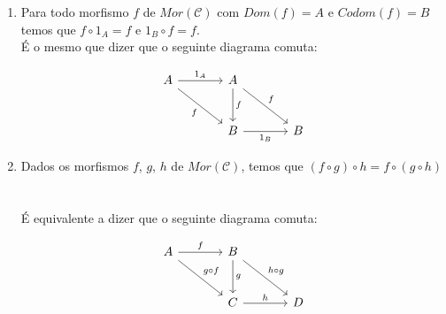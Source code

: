 \begin{defi}[Categorias]
\begin{enumerate}
\item Para todo morfismo $f$ de $Mor(\mathcal{C})$ com $Dom(f) = A$ e $Codom(f) = B$ temos que $f \circ 1_A = f$ e $1_B \circ f = f$.
\\ É o mesmo que dizer que o seguinte diagrama comuta:

\[\begin{tikzcd}[sep=large]
	A & A \\
	& B & B
	\arrow["{1_A}", from=1-1, to=1-2]
	\arrow["f"', from=1-1, to=2-2]
	\arrow["f", from=1-2, to=2-2]
	\arrow["f", from=1-2, to=2-3]
	\arrow["{1_B}"', from=2-2, to=2-3]
\end{tikzcd}\]
\item Dados os morfismos $f$, $g$, $h$ de $Mor(\mathcal{C})$, temos que 
$(f \circ g) \circ h = f \circ (g \circ h)$
\\
\\
\\
É equivalente a dizer que o seguinte diagrama comuta:

\[\begin{tikzcd}[sep=large]
	A & B \\
	& C & D
	\arrow["f", from=1-1, to=1-2]
	\arrow["{g \circ f}", from=1-1, to=2-2]
	\arrow["g", from=1-2, to=2-2]
	\arrow["{h \circ g}", from=1-2, to=2-3]
	\arrow["h", from=2-2, to=2-3]
\end{tikzcd}\]
\end{enumerate}
\end{defi}



